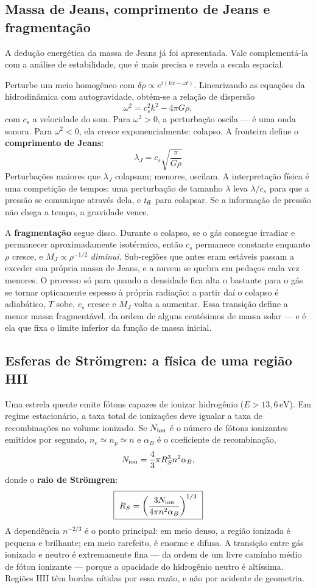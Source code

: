 \documentclass[11pt,a4paper]{article}
\begin{document}
\subsection*{Massa de Jeans, comprimento de Jeans e fragmentação}

A dedução energética da massa de Jeans já foi apresentada. Vale complementá-la com a análise de estabilidade, que é mais precisa e revela a escala espacial.

Perturbe um meio homogêneo com $\delta\rho\propto e^{i(kx-\omega t)}$. Linearizando as equações da hidrodinâmica com autogravidade, obtém-se a relação de dispersão
\[
\omega^{2}=c_s^{2}k^{2}-4\pi G\rho,
\]
com $c_s$ a velocidade do som. Para $\omega^{2}>0$, a perturbação oscila --- é uma onda sonora. Para $\omega^{2}<0$, ela cresce exponencialmente: colapso. A fronteira define o \textbf{comprimento de Jeans}:
\[
\boxed{\ \lambda_J=c_s\sqrt{\frac{\pi}{G\rho}}\ }
\]
Perturbações maiores que $\lambda_J$ colapsam; menores, oscilam. A interpretação física é uma competição de tempos: uma perturbação de tamanho $\lambda$ leva $\lambda/c_s$ para que a pressão se comunique através dela, e $t_{\rm ff}$ para colapsar. Se a informação de pressão não chega a tempo, a gravidade vence.

A \textbf{fragmentação} segue disso. Durante o colapso, se o gás consegue irradiar e permanecer aproximadamente isotérmico, então $c_s$ permanece constante enquanto $\rho$ cresce, e $M_J\propto\rho^{-1/2}$ \emph{diminui}. Sub-regiões que antes eram estáveis passam a exceder sua própria massa de Jeans, e a nuvem se quebra em pedaços cada vez menores. O processo só para quando a densidade fica alta o bastante para o gás se tornar opticamente espesso à própria radiação: a partir daí o colapso é adiabático, $T$ sobe, $c_s$ cresce e $M_J$ volta a aumentar. Essa transição define a menor massa fragmentável, da ordem de alguns centésimos de massa solar --- e é ela que fixa o limite inferior da função de massa inicial.

\subsection*{Esferas de Strömgren: a física de uma região HII}

Uma estrela quente emite fótons capazes de ionizar hidrogênio ($E>13{,}6\,\mathrm{eV}$). Em regime estacionário, a taxa total de ionizações deve igualar a taxa de recombinações no volume ionizado. Se $N_{\rm ion}$ é o número de fótons ionizantes emitidos por segundo, $n_e\simeq n_p\simeq n$ e $\alpha_B$ é o coeficiente de recombinação,
\[
N_{\rm ion}=\frac{4}{3}\pi R_S^{3}n^{2}\alpha_B,
\]
donde o \textbf{raio de Strömgren}:
\[
\boxed{\ R_S=\left(\frac{3N_{\rm ion}}{4\pi n^{2}\alpha_B}\right)^{1/3}\ }
\]
A dependência $n^{-2/3}$ é o ponto principal: em meio denso, a região ionizada é pequena e brilhante; em meio rarefeito, é enorme e difusa. A transição entre gás ionizado e neutro é extremamente fina --- da ordem de um livre caminho médio de fóton ionizante --- porque a opacidade do hidrogênio neutro é altíssima. Regiões HII têm bordas nítidas por essa razão, e não por acidente de geometria.
\end{document}

